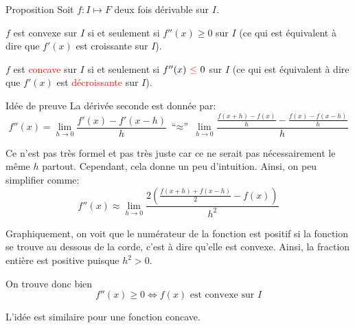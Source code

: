 \documentclass[a4paper]{article}
\begin{document}
\begin{parag}{Proposition}
    Soit $f : I \mapsto F$ deux fois dérivable sur $I$.

    $f$ est convexe sur $I$ si et seulement si $f''\left(x\right) \geq 0$ sur $I$ (ce qui est équivalent à dire que $f'\left(x\right)$ est croissante sur $I$).

    $f$ est \textcolor{red}{concave} sur $I$ si et seulement si $f''\left(x\right)\ {\color{red}\leq}\ 0$ sur $I$ (ce qui est équivalent à dire que $f'\left(x\right)$ est \textcolor{red}{décroissante} sur $I$).

    \begin{subparag}{Idée de preuve}
        La dérivée seconde est donnée par:
        \[f''\left(x\right) = \lim_{h \to 0} \frac{f'\left(x\right) - f'\left(x - h\right)}{h}\ \text{``$\approx$''}\ \lim_{h \to 0} \frac{\frac{f\left(x + h\right) - f\left(x\right)}{h} - \frac{f\left(x\right) - f\left(x - h\right)}{h}}{h}\]

        Ce n'est pas très formel et pas très juste car ce ne serait pas nécessairement le même $h$ partout. Cependant, cela donne un peu d'intuition. Ainsi, on peu simplifier comme:
        \[f''\left(x\right) \approx \lim_{h \to 0} \frac{2 \left(\frac{f\left(x + h\right) + f\left(x - h\right)}{2} - f\left(x\right)\right)}{h^2}\]


        Graphiquement, on voit que le numérateur de la fonction est positif si la fonction se trouve au dessous de la corde, c'est à dire qu'elle est convexe. Ainsi, la fraction entière est positive puisque $h^2 > 0$.

        On trouve donc bien
        \[f''\left(x\right) \geq 0 \iff f\left(x\right) \text{ est convexe sur } I\]

        L'idée est similaire pour une fonction concave.
    \end{subparag}
\end{parag}
\end{document}
